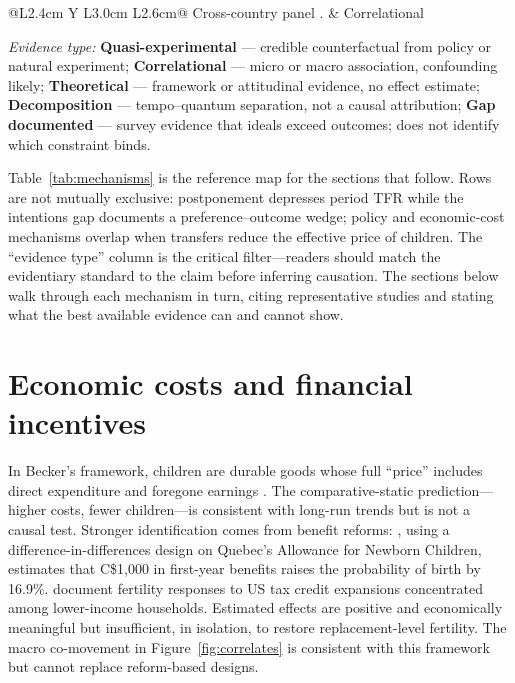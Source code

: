 \documentclass[11pt,a4paper,openany]{book}
\begin{document}
\begin{table}[htbp]
\begin{tabularx}{\textwidth}{@{}L{2.4cm} Y L{3.0cm} L{2.6cm}@{}}
    Cross-country panel \citep{myrskyla2009}. &
    Correlational \\
    \bottomrule
  \end{tabularx}
  \vspace{4pt}
  \raggedright\footnotesize
  \textit{Evidence type:}
  \textbf{Quasi-experimental} --- credible counterfactual from policy or natural experiment;
  \textbf{Correlational} --- micro or macro association, confounding likely;
  \textbf{Theoretical} --- framework or attitudinal evidence, no effect estimate;
  \textbf{Decomposition} --- tempo--quantum separation, not a causal attribution;
  \textbf{Gap documented} --- survey evidence that ideals exceed outcomes; does not identify which constraint binds.
\end{table}

Table~\ref{tab:mechanisms} is the reference map for the sections that follow. Rows are not mutually exclusive: postponement depresses period TFR while the intentions gap documents a preference--outcome wedge; policy and economic-cost mechanisms overlap when transfers reduce the effective price of children. The ``evidence type'' column is the critical filter---readers should match the evidentiary standard to the claim before inferring causation. The sections below walk through each mechanism in turn, citing representative studies and stating what the best available evidence can and cannot show.

\section{Economic costs and financial incentives}

In Becker's framework, children are durable goods whose full ``price'' includes direct expenditure and foregone earnings \citep{becker1960}. The comparative-static prediction---higher costs, fewer children---is consistent with long-run trends but is not a causal test. Stronger identification comes from benefit reforms: \citet{milligan2005}, using a difference-in-differences design on Quebec's Allowance for Newborn Children, estimates that C\$1{,}000 in first-year benefits raises the probability of birth by 16.9\%. \citet{cohen2013} document fertility responses to US tax credit expansions concentrated among lower-income households. Estimated effects are positive and economically meaningful but insufficient, in isolation, to restore replacement-level fertility. The macro co-movement in Figure~\ref{fig:correlates} is consistent with this framework but cannot replace reform-based designs.
\end{document}
